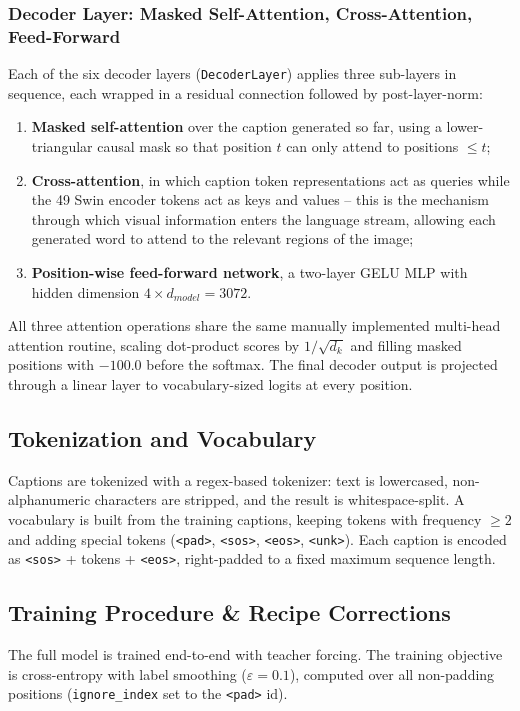 \documentclass[conference]{IEEEtran}
\begin{document}
\subsubsection{Decoder Layer: Masked Self-Attention, Cross-Attention, Feed-Forward}
Each of the six decoder layers (\texttt{DecoderLayer}) applies three sub-layers in sequence, each wrapped in a residual connection followed by post-layer-norm:
\begin{enumerate}
    \item \textbf{Masked self-attention} over the caption generated so far, using a lower-triangular causal mask so that position $t$ can only attend to positions $\le t$;
    \item \textbf{Cross-attention}, in which caption token representations act as queries while the 49 Swin encoder tokens act as keys and values -- this is the mechanism through which visual information enters the language stream, allowing each generated word to attend to the relevant regions of the image;
    \item \textbf{Position-wise feed-forward network}, a two-layer GELU MLP with hidden dimension $4\times d_{model}=3072$.
\end{enumerate}
All three attention operations share the same manually implemented multi-head attention routine, scaling dot-product scores by $1/\sqrt{d_k}$ and filling masked positions with $-100.0$ before the softmax. The final decoder output is projected through a linear layer to vocabulary-sized logits at every position.

\subsection{Tokenization and Vocabulary}
\label{sec:method-vocab}
Captions are tokenized with a regex-based tokenizer: text is lowercased, non-alphanumeric characters are stripped, and the result is whitespace-split. A vocabulary is built from the training captions, keeping tokens with frequency $\ge 2$ and adding special tokens (\texttt{<pad>}, \texttt{<sos>}, \texttt{<eos>}, \texttt{<unk>}). Each caption is encoded as \texttt{<sos>} + tokens + \texttt{<eos>}, right-padded to a fixed maximum sequence length.

\subsection{Training Procedure \& Recipe Corrections}
\label{sec:method-training}
The full model is trained end-to-end with teacher forcing. The training objective is cross-entropy with label smoothing ($\varepsilon=0.1$), computed over all non-padding positions (\texttt{ignore\_index} set to the \texttt{<pad>} id).
\end{document}
